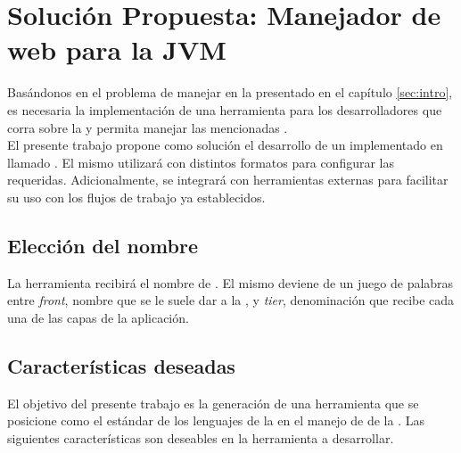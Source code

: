 \section{Solución Propuesta: Manejador de \dependencies web para la JVM}
\label{sec:solution}

Basándonos en el problema de manejar \dependencies en la \viewtier presentado 
en el capítulo \ref{sec:intro}, es necesaria la implementación de una 
herramienta para los desarrolladores que corra sobre la \jvm y permita manejar 
las mencionadas \dependencies.\\
El presente trabajo propone como solución el desarrollo de un \depmgr 
implementado en 
\scala llamado \fronttier. El mismo utilizará \conffiles con distintos formatos 
para configurar las \dependencies requeridas. Adicionalmente, se integrará con 
herramientas externas para facilitar su uso con los flujos de trabajo ya 
establecidos.\\

\subsection{Elección del nombre}
\label{subsec:solution:naming}

La herramienta recibirá el nombre de \fronttier. El mismo deviene de un juego 
de palabras entre \emph{front}, nombre que se le suele dar a la 
\viewtier, y \emph{tier}, denominación que recibe cada una de las capas de la 
aplicación.

\subsection{Características deseadas}
\label{subsec:solution:whishlist}

El objetivo del presente trabajo es la generación de una herramienta que se 
posicione como el estándar de los lenguajes de la \jvm en el manejo de 
\dependencies de la \viewtier. Las siguientes características son deseables en 
la herramienta a desarrollar.

